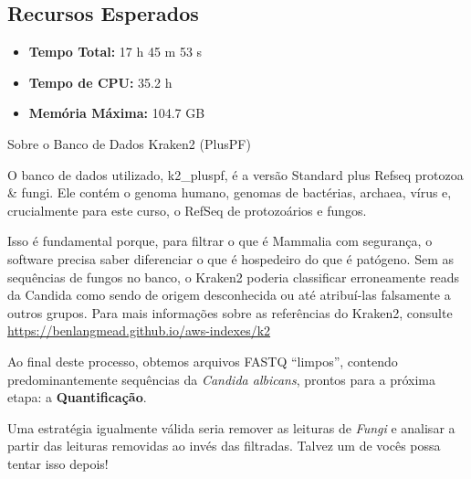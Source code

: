 \documentclass[
  letterpaper,
  DIV=11,
  numbers=noendperiod]{scrreprt}
\providecommand{\tightlist}{%
  \setlength{\itemsep}{0pt}\setlength{\parskip}{0pt}}
\begin{document}
\subsection{Recursos Esperados}\label{recursos-esperados}

\begin{itemize}
\tightlist
\item
  \textbf{Tempo Total:} 17 h 45 m 53 s
\item
  \textbf{Tempo de CPU:} 35.2 h
\item
  \textbf{Memória Máxima:} 104.7 GB
\end{itemize}

\begin{tcolorbox}[enhanced jigsaw, arc=.35mm, colframe=quarto-callout-tip-color-frame, breakable, bottomrule=.15mm, colback=white, left=2mm, titlerule=0mm, opacityback=0, title=\textcolor{quarto-callout-tip-color}{\faLightbulb}\hspace{0.5em}{Tip}, leftrule=.75mm, colbacktitle=quarto-callout-tip-color!10!white, bottomtitle=1mm, toprule=.15mm, toptitle=1mm, rightrule=.15mm, opacitybacktitle=0.6, coltitle=black]

Sobre o Banco de Dados Kraken2 (PlusPF)

O banco de dados utilizado, k2\_pluspf, é a versão Standard plus Refseq
protozoa \& fungi. Ele contém o genoma humano, genomas de bactérias,
archaea, vírus e, crucialmente para este curso, o RefSeq de protozoários
e fungos.

Isso é fundamental porque, para filtrar o que é Mammalia com segurança,
o software precisa saber diferenciar o que é hospedeiro do que é
patógeno. Sem as sequências de fungos no banco, o Kraken2 poderia
classificar erroneamente reads da Candida como sendo de origem
desconhecida ou até atribuí-las falsamente a outros grupos. Para mais
informações sobre as referências do Kraken2, consulte
\url{https://benlangmead.github.io/aws-indexes/k2}

\end{tcolorbox}

Ao final deste processo, obtemos arquivos FASTQ ``limpos'', contendo
predominantemente sequências da \emph{Candida albicans}, prontos para a
próxima etapa: a \textbf{Quantificação}.

\begin{tcolorbox}[enhanced jigsaw, arc=.35mm, colframe=quarto-callout-note-color-frame, breakable, bottomrule=.15mm, colback=white, left=2mm, titlerule=0mm, opacityback=0, title=\textcolor{quarto-callout-note-color}{\faInfo}\hspace{0.5em}{Ponto Importante}, leftrule=.75mm, colbacktitle=quarto-callout-note-color!10!white, bottomtitle=1mm, toprule=.15mm, toptitle=1mm, rightrule=.15mm, opacitybacktitle=0.6, coltitle=black]

Uma estratégia igualmente válida seria remover as leituras de
\emph{Fungi} e analisar a partir das leituras removidas ao invés das
filtradas. Talvez um de vocês possa tentar isso depois!

\end{tcolorbox}
\end{document}
